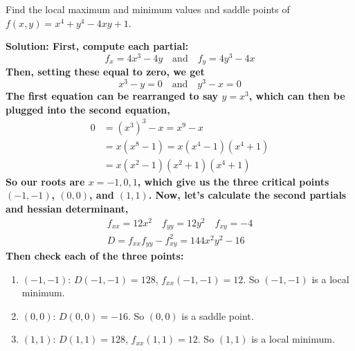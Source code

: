 \begin{example}
    Find the local maximum and minimum values and saddle points of \(f(x,y)=x^4+y^4-4xy+1\).\par\bf{Solution: }
    First, compute each partial:
    \[ f_x = 4x^3-4y\quad\text{and}\quad f_y = 4y^3-4x\]
    Then, setting these equal to zero, we get
    \[ x^3-y=0\quad\text{and}\quad y^3-x=0\]
    The first equation can be rearranged to say \(y=x^3\), which can then be plugged into the second equation,
    \begin{align*}
        0 &= (x^3)^3 -x = x^9 -x \\&= x(x^8 - 1) = x(x^4-1)(x^4+1) \\
        &= x(x^2-1)(x^2+1)(x^4+1)
    \end{align*}
    So our roots are \(x=-1, 0, 1\), which give us the three critical points \((-1, -1)\), \((0, 0)\), and \((1, 1)\). Now, let's calculate the second partials and hessian determinant,
    \begin{align*}
        f_{xx} = 12x^2\quad f_{yy} = 12y^2\quad f_{xy}=-4 \\
        D = f_{xx}f_{yy} - f_{xy}^2 = 144x^2y^2-16
    \end{align*}
    Then check each of the three points:
    \begin{enumerate}
        \item \((-1, -1)\): \(D(-1, -1) = 128\), \(f_{xx}(-1, -1) = 12\). So \((-1, -1)\) is a local minimum.
        \item \((0, 0)\): \(D(0, 0) = -16\). So \((0, 0)\) is a saddle point.
        \item \((1, 1)\): \(D(1, 1) = 128\), \(f_{xx}(1, 1)= 12\). So \((1, 1)\) is a local minimum.
    \end{enumerate}
\end{example}
